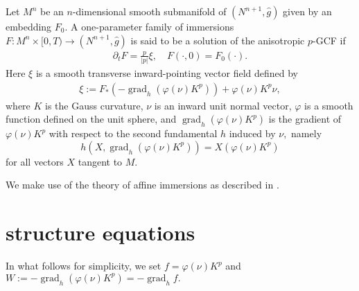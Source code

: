 \documentclass{amsart}
\theoremstyle{definition}
\theoremstyle{remark}
\numberwithin{equation}{section}
\begin{document}
\title[]
 {}

\curraddr{}
\email{}
\date{\today}

\dedicatory{}
\subjclass[2010]{}
\keywords{}

\begin{abstract}

\end{abstract}

\maketitle
Let $M^n$ be an $n$-dimensional smooth submanifold of $(N^{n+1},\hat{g})$ given by an embedding $F_0.$ A one-parameter family of immersions $F\colon M^n\times [0,T)\to (N^{n+1},\hat{g})$ is said to be a solution of the anisotropic $ p $-GCF if
\begin{align}
\partial_tF=\frac{p}{|p|}\xi,\quad F(\cdot,0)=F_0(\cdot).
\end{align}
Here $\xi $ is a smooth transverse inward-pointing vector field defined by
\begin{align}
\xi:=F_{\ast}(-\operatorname{grad}_h(\varphi(\nu)K^p))+\varphi(\nu) K^{ p }\nu,
\end{align}
where $ K $ is the Gauss curvature, $\nu$ is an inward unit normal vector, $\varphi$ is a smooth function defined on the unit sphere, and $\operatorname{grad}_h(\varphi(\nu)K^p)$ is the gradient of $\varphi(\nu)K^p$ with respect to the second fundamental $h$ induced by $\nu,$ namely
\[
h(X, \operatorname{grad}_h (\varphi(\nu)K^p)) = X(\varphi(\nu)K^p)
\]
for all vectors $X$ tangent to $M$.

We make use of the theory of affine immersions as described in \cite{MR1311248}. 
\section{structure equations}
In what follows for simplicity, we set $ f = \varphi(\nu)K^p$ and $W:=-\operatorname{grad}_h(\varphi(\nu)K^p) = - \operatorname{grad}_h f.$
\end{document}
